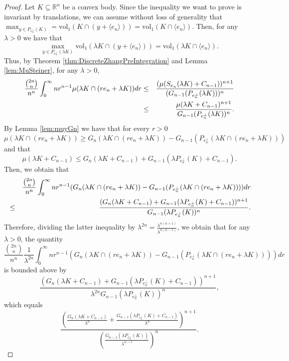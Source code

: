 \documentclass[10pt]{amsart}
\def\R{\mathbb{R}}
\def\vol{\mathrm{vol}}
\numberwithin{equation}{section}
\begin{document}
\begin{proof}
Let $K\subseteq\R^n$ be a convex body. Since the inequality we want to prove is invariant by translations, we can assume without loss of generality that \\$\displaystyle{\max_{y\in P_{e_n^\perp}(K)}=\vol_1(K\cap(y+\langle e_n\rangle))=\vol_1(K\cap\langle e_n\rangle)}$. Then, for any $\lambda>0$ we have that
$$
\max_{y\in P_{e_n^\perp}(\lambda K)}\vol_1(\lambda K\cap(y+\langle e_n\rangle))=\vol_1(\lambda K\cap\langle e_n\rangle).
$$
Thus, by Theorem \ref{thm:DiscreteZhangPreIntegration} and Lemma \ref{lem:MuSteiner}, for any $\lambda>0$,
\begin{eqnarray*}
\frac{{{2n}\choose{n}}}{n^n}\int_0^\infty nr^{n-1}\mu(\lambda K\cap(re_n+\lambda K))dr&\leq&\frac{(\mu(S_{e_n}(\lambda K)+C_{n-1}))^{n+1}}{(G_{n-1}(P_{e_n^\perp}(\lambda K)))^n}\cr
&\leq&\frac{\mu(\lambda K+C_{n-1})^{n+1}}{G_{n-1}(P_{e_n^\perp}(\lambda K))^n}.
\end{eqnarray*}
By Lemma \ref{lem:muyGn} we have that for every $r>0$
$$
\mu(\lambda K\cap(re_n+\lambda K))\geq G_n(\lambda K\cap(re_n+\lambda K))-G_{n-1}(P_{e_n^\perp}(\lambda K\cap(re_n+\lambda K)))
$$
and that
$$
\mu(\lambda K+C_{n-1})\leq G_n(\lambda K+C_{n-1})+G_{n-1}(\lambda P_{e_n^\perp}(K)+C_{n-1}).
$$
Then, we obtain that
\begin{eqnarray*}
&&\frac{{{2n}\choose{n}}}{n^n}\int_0^\infty nr^{n-1}(G_n(\lambda K\cap(re_n+\lambda K))-G_{n-1}(P_{e_n^\perp}(\lambda K\cap(re_n+\lambda K))))dr\cr
&\leq&\frac{(G_n(\lambda K+C_{n-1})+G_{n-1}(\lambda P_{e_n^\perp}(K)+C_{n-1}))^{n+1}}{G_{n-1}(\lambda P_{e_n^\perp}(K))^n}.
\end{eqnarray*}
Therefore, dividing the latter inequality by $\lambda^{2n}=\frac{\lambda^{n(n+1)}}{\lambda^{n(n-1)}}$, we obtain that for any $\lambda>0$, the quantity
\begin{equation}\label{eq:InequaliProposition41Left}
\frac{{{2n}\choose{n}}}{n^n}\frac{1}{\lambda^{2n}}\int_0^\infty nr^{n-1}(G_n(\lambda K\cap(re_n+\lambda K))-G_{n-1}(P_{e_n^\perp}(\lambda K\cap(re_n+\lambda K))))dr
\end{equation}
is bounded above by
$$
\frac{(G_n(\lambda K+C_{n-1})+G_{n-1}(\lambda P_{e_n^\perp}(K)+C_{n-1}))^{n+1}}{\lambda^{2n}G_{n-1}(\lambda P_{e_n^\perp}(K))^n},
$$
which equals
\begin{equation}\label{eq:InequaliProposition41}
\frac{\left(\frac{G_n(\lambda K+C_{n-1})}{\lambda^n}+\frac{G_{n-1}(\lambda P_{e_n^\perp}(K)+C_{n-1})}{\lambda^n}\right)^{n+1}}{\left(\frac{G_{n-1}(\lambda P_{e_n^\perp}(K))}{\lambda^{n-1}}\right)^n}.
\end{equation}


\end{proof}
\end{document}
